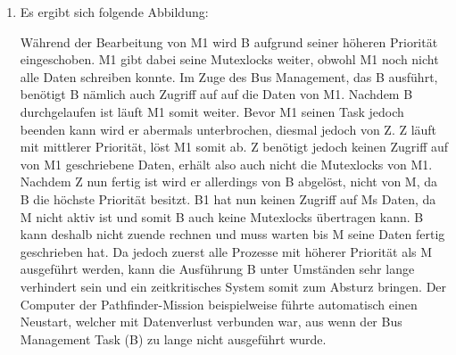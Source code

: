 \documentclass[a4paper,11pt]{scrartcl}
\begin{document}
\begin{enumerate}[\bf a)]
    \item Es ergibt sich folgende Abbildung:
    \begin{center}
        \scalebox{0.4}{}
    \end{center}
    
    
    Während der Bearbeitung von M1 wird B aufgrund seiner höheren Priorität eingeschoben. M1 gibt dabei seine Mutexlocks weiter, obwohl M1 noch nicht alle Daten schreiben konnte. Im Zuge des Bus Management, das B ausführt, benötigt B nämlich auch Zugriff auf auf die Daten von M1. Nachdem B durchgelaufen ist läuft M1 somit weiter. Bevor M1 seinen Task jedoch beenden kann wird er abermals unterbrochen, diesmal jedoch von Z. Z läuft mit mittlerer Priorität, löst M1 somit ab. Z benötigt jedoch keinen Zugriff auf von M1 geschriebene Daten, erhält also auch nicht die Mutexlocks von M1. Nachdem Z nun fertig ist wird er allerdings von B abgelöst, nicht von M, da B die höchste Priorität besitzt. B1 hat nun keinen Zugriff auf Ms Daten, da M nicht aktiv ist und somit B auch keine Mutexlocks übertragen kann. B kann deshalb nicht zuende rechnen und muss warten bis M seine Daten fertig geschrieben hat. Da jedoch zuerst alle Prozesse mit höherer Priorität als M ausgeführt werden, kann die Ausführung B unter Umständen sehr lange verhindert sein und ein zeitkritisches System somit zum Absturz bringen. Der Computer der Pathfinder-Mission beispielweise führte automatisch einen Neustart, welcher mit Datenverlust verbunden war, aus wenn der Bus Management Task (B) zu lange nicht ausgeführt wurde. 
\end{enumerate}
\end{document}
